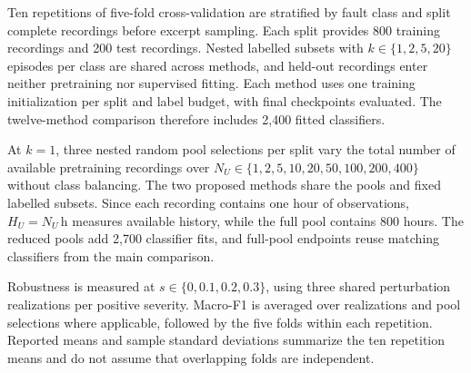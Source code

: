 Ten repetitions of five-fold cross-validation are stratified by fault class and split complete recordings before excerpt sampling. Each split provides 800 training recordings and 200 test recordings. Nested labelled subsets with $k\in\{1,2,5,20\}$ episodes per class are shared across methods, and held-out recordings enter neither pretraining nor supervised fitting. Each method uses one training initialization per split and label budget, with final checkpoints evaluated. The twelve-method comparison therefore includes 2,400 fitted classifiers.

At $k=1$, three nested random pool selections per split vary the total number of available pretraining recordings over $N_U\in\{1,2,5,10,20,50,100,200,400\}$ without class balancing. The two proposed methods share the pools and fixed labelled subsets. Since each recording contains one hour of observations, $H_U=N_U\,\mathrm{h}$ measures available history, while the full pool contains 800 hours. The reduced pools add 2,700 classifier fits, and full-pool endpoints reuse matching classifiers from the main comparison.

Robustness is measured at $s\in\{0,0.1,0.2,0.3\}$, using three shared perturbation realizations per positive severity. Macro-F1 is averaged over realizations and pool selections where applicable, followed by the five folds within each repetition. Reported means and sample standard deviations summarize the ten repetition means and do not assume that overlapping folds are independent.
